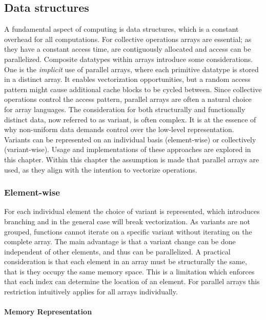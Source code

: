 \documentclass{article}
\begin{document}
\newpage

\subsection{Data structures}

A fundamental aspect of computing is data structures, which is a constant overhead for all computations.
For collective operations arrays are essential; as they have a constant access time, are contiguously allocated and access can be parallelized.
Composite datatypes within arrays introduce some considerations.
One is the {\it implicit} use of parallel arrays, where each primitive datatype is stored in a distinct array.
It enables vectorization opportunities, but a random access pattern might cause additional cache blocks to be cycled between.
Since collective operations control the access pattern, parallel arrays are often a natural choice for array languages.
The consideration for both structurally and functionally distinct data, now referred to as variant, is often complex.
It is at the essence of why non-uniform data demands control over the low-level representation.
Variants can be represented on an individual basis (element-wise) or collectively (variant-wise).
Usage and implementations of these approaches are explored in this chapter. 
Within this chapter the assumption is made that parallel arrays are used, as they align with the intention to vectorize operations. 

\subsubsection{Element-wise}

For each individual element the choice of variant is represented, which introduces branching and in the general case will break vectorization.
As variants are not grouped, functions cannot iterate on a specific variant without iterating on the complete array.
The main advantage is that a variant change can be done independent of other elements, and thus can be parallelized.
A practical consideration is that each element in an array must be structurally the same, that is they occupy the same memory space.
This is a limitation which enforces that each index can determine the location of an element. 
For parallel arrays this restriction intuitively applies for all arrays individually\cite{accelerate-sum-types}.

\paragraph{Memory Representation}
\end{document}
